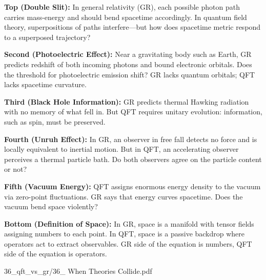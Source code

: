 \begin{SideNotePage}{

    \textbf{Top (Double Slit):}  
    In general relativity (GR), each possible photon path carries mass-energy and should bend spacetime accordingly. In quantum field theory, superpositions of paths interfere—but how does spacetime metric respond to a superposed trajectory? \par
  
    \textbf{Second (Photoelectric Effect):}  
    Near a gravitating body such as Earth, GR predicts redshift of both incoming photons and bound electronic orbitals. Does the threshold for photoelectric emission shift? GR lacks quantum orbitals; QFT lacks spacetime curvature. \par
  
    \textbf{Third (Black Hole Information):}  
    GR predicts thermal Hawking radiation with no memory of what fell in. But QFT requires unitary evolution: information, such as spin, must be preserved. \par
  
    \textbf{Fourth (Unruh Effect):}  
    In GR, an observer in free fall detects no force and is locally equivalent to inertial motion. But in QFT, an accelerating observer perceives a thermal particle bath. Do both observers agree on the particle content or not? \par
  
    \textbf{Fifth (Vacuum Energy):}  
    QFT assigns enormous energy density to the vacuum via zero-point fluctuations. GR says that energy curves spacetime. Does the vacuum bend space violently? \par
  
    \textbf{Bottom (Definition of Space):}  
    In GR, space is a manifold with tensor fields assigning numbers to each point. In QFT, space is a passive backdrop where operators act to extract observables. GR side of the equation is numbers, QFT side of the equation is operators. \par
}{36_qft_vs_gr/36_ When Theories Collide.pdf}
\end{SideNotePage}
